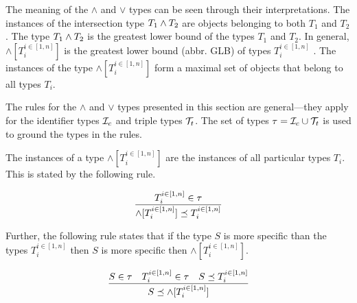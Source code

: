 \documentclass[runningheads]{llncs}
\newcommand{\I}{{\cal I}}
\newcommand{\T}{{\cal T}}
\newcommand{\memo}[1]{}
\begin{document}
\memo{
The meaning of the $\land$ and $\lor$ types can be defined through
their interpretations. The following definition expresses the
denotation of a $\lor$ type with the interpretations of its component
types. Suppose we have a set of types
$\forall\/i\in\/[1..n],\ T_i\in\tau$.

\begin{displaymath}
  \llbracket\lor[T_i^{i\in[1,n]}]\rrbracket_\D = \bigcup_{i\in[1..n]}\llbracket\/T_i\rrbracket_\D
\end{displaymath}

Similarly, the interpretation of a $\land$ type is the intersection of
the interpretations of its component types.

\begin{displaymath}
\llbracket\land[T_i^{i\in[1,n]}]\rrbracket_\D = \bigcap_{i\in[1..n]}\llbracket\/T_i\rrbracket_\D
\end{displaymath}}

The meaning of the $\land$ and $\lor$ types can be seen through
their interpretations. The instances of the intersection type
$T_1\land\/T_2$ are objects belonging to both $T_1$ and $T_2$. The
type $T_1\land\/T_2$ is the greatest lower bound of the types $T_1$
and $T_2$. In general, $\land[T_i^{i\in[1,n]}]$ is the greatest lower
bound (abbr. GLB) of types $T_i^{i\in[1,n]}$
\cite{Pierce1991,Pierce1996}. The instances of the type
$\land[T_i^{i\in[1,n]}]$ form a maximal set of objects that belong to
all types $T_i$.

The rules for the $\land$ and $\lor$ types presented in this section
are general---they apply for the identifier types $\I_c$ and triple
types $\T_t$. The set of types $\tau=\I_c\cup\T_t$ is used to ground
the types in the rules.

The instances of a type $\land[T_i^{i\in[1,n]}]$ are the instances of all
particular types $T_i$. This is stated by the following rule. 

\begin{equation}
\dfrac{T_i^{i\in[1,n]}\in\tau}
      {\land[T_i^{i\in[1,n]}] \preceq\/T_i^{i\in[1,n]}} 
\end{equation}

Further, the following rule states that if the type $S$ is more
specific than the types $T_i^{i\in[1,n]}$ then $S$ is more specific
then $\land[T_i^{i\in[1,n]}]$.

\begin{equation}
\label{rul:land-preceq}
\dfrac{S\in\tau\quad\/T_i^{i\in[1,n]}\in\tau\quad\/S\preceq\/T_i^{i\in[1,n]}}
      {S\preceq\land[T_i^{i\in[1,n]}]}  
\end{equation} 
\end{document}
